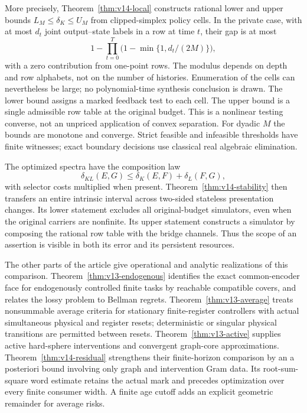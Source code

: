 More precisely, Theorem~\ref{thm:v14-local} constructs rational lower and
upper bounds $L_M\le\delta_K\le U_M$ from clipped-simplex policy cells.
In the private case, with at most $d_t$ joint output--state labels in a
row at time $t$, their gap is at most
\[
 1-\prod_{t=0}^T\bigl(1-\min\{1,d_t/(2M)\}\bigr),
\]
with a zero contribution from one-point rows. The modulus depends on depth
and row alphabets, not on the number of histories. Enumeration of the
cells can nevertheless be large; no polynomial-time synthesis conclusion
is drawn. The lower bound assigns a marked feedback test to each cell.
The upper bound is a single admissible row table at the original budget.
This is a nonlinear testing converse, not an unpriced application of
convex separation. For dyadic $M$ the bounds are monotone and converge.
Strict feasible and infeasible thresholds have finite witnesses; exact
boundary decisions use classical real algebraic elimination.

The optimized spectra have the composition law
\[
 \delta_{KL}(E,G)\le\delta_K(E,F)+\delta_L(F,G),
\]
with selector costs multiplied when present. Theorem~\ref{thm:v14-stability}
then transfers an entire intrinsic interval across two-sided stateless
presentation changes. Its lower statement excludes all original-budget
simulators, even when the original carriers are nonfinite. Its upper
statement constructs a simulator by composing the rational row table with
the bridge channels. Thus the scope of an assertion is visible in both
its error and its persistent resources.

The other parts of the article give operational and analytic realizations
of this comparison. Theorem~\ref{thm:v13-endogenous} identifies the exact
common-encoder face for endogenously controlled finite tasks by reachable
compatible covers, and relates the lossy problem to Bellman regrets.
Theorem~\ref{thm:v13-average} treats nonsummable average criteria for
stationary finite-register controllers with actual simultaneous physical
and register resets; deterministic or singular physical transitions are
permitted between resets. Theorem~\ref{thm:v13-active} supplies active
hard-sphere interventions and convergent graph-core approximations.
Theorem~\ref{thm:v14-residual} strengthens their finite-horizon comparison
by an a posteriori bound involving only graph and intervention Gram data.
Its root-sum-square word estimate retains the actual mark and precedes
optimization over every finite consumer width. A finite age cutoff adds
an explicit geometric remainder for average risks.

